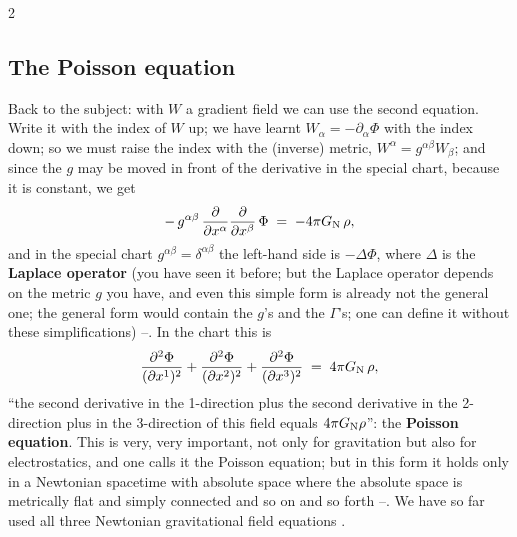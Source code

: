 \begin{paracol}{2}
\subsection{The Poisson equation}\label{ssec:ng-poisson}

Back to the subject: with $W$ a gradient field we can use the second equation. Write it with the index of $W$ up; we have learnt $W_\alpha=-\partial_\alpha\Phi$ with the index down; so we must raise the index with the (inverse) metric, $W^\alpha=g^{\alpha\beta}W_\beta$; and since the $g$ may be moved in front of the derivative in the special chart, because it is constant, we get
\begin{equation}\label{eq:ng-poisson-pre}
  -\,g^{\alpha\beta}\,\frac{\partial}{\partial x^\alpha}\frac{\partial}{\partial x^\beta}\,\Phi\;=\;-4\pi G_{\rm N}\,\rho ,
\end{equation}
and in the special chart $g^{\alpha\beta}=\delta^{\alpha\beta}$ the left-hand side is $-\Delta\Phi$, where $\Delta$ is the \textbf{Laplace operator} (you have seen it before; but the Laplace operator depends on the metric $g$ you have, and even this simple form is already not the general one; the general form would contain the $g$'s and the $\Gamma$'s; one can define it without these simplifications) --. In the chart this is
\begin{equation}\label{eq:ng-poisson}
  \frac{\partial^2\Phi}{(\partial x^1)^2}+\frac{\partial^2\Phi}{(\partial x^2)^2}+\frac{\partial^2\Phi}{(\partial x^3)^2}\;=\;4\pi G_{\rm N}\,\rho ,
\end{equation}
``the second derivative in the 1-direction plus the second derivative in the 2-direction plus in the 3-direction of this field equals $4\pi G_{\rm N}\rho$'': the \textbf{Poisson equation}. This is very, very important, not only for gravitation but also for electrostatics, and one calls it the Poisson equation; but in this form it holds only in a Newtonian spacetime with absolute space where
the absolute space is metrically flat and simply connected and so on and so forth --. We have so far used all three Newtonian gravitational field equations .


\end{paracol}
